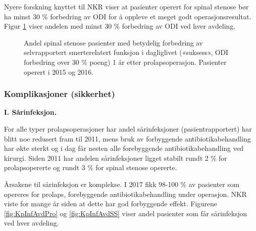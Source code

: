 \documentclass [norsk,a4paper,twoside]{article}\usepackage[]{graphicx}\usepackage[]{color}
\begin{document}
Nyere forskning knyttet til NKR viser at pasienter operert for spinal stenose bør ha minst 30 \% forbedring av ODI for å oppleve et meget godt operasjonsresultat. Figur \ref{fig:OswEndr30pstSS} viser andelen med minst 30 \% forbedring av ODI ved hver avdeling.

\begin{figure}[ht]
\caption{\label{fig:OswEndr30pstSS} Andel spinal stenose pasienter med betydelig forbedring av selvrapportert
      smerterelatert funksjon i dagliglivet («suksess», ODI forbedring over 30 \% poeng) 1 år
      etter prolapsoperasjon. Pasienter operert i 2015 og 2016.}
\end{figure}













\subsubsection{Komplikasjoner (sikkerhet)}

\textbf{I. Sårinfeksjon.}

      For alle typer prolapsoperasjoner har
andel sårinfeksjoner (pasientrapportert) har blitt noe redusert fram til 2011, mens bruk av  forbyggende antibiotikabehandling har økte sterkt og i dag får nesten alle forebyggende antibiotikabehandling ved kirurgi. Siden 2011 har andelen sårinfeksjoner ligget stabilt rundt 2 \% for prolapsopererte og rundt 3 \% for spinal stenose opererte.



Årsakene til sårinfeksjon er komplekse. I 2017 fikk 98-100 \% av pasienter som
opereres for prolaps, forebyggende antibiotikabehandling under operasjon. NKR
viste for mange år siden at dette har god forbyggende effekt. Figurene \ref{fig:KpInfAvdPro} og \ref{fig:KpInfAvdSS} viser andel pasienter som får sårinfeksjon ved hver avdeling.
\end{document}

